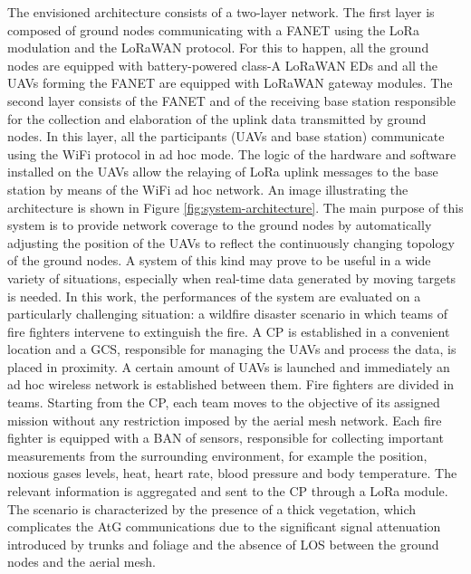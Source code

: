 The envisioned architecture consists of a two-layer network. The first layer is composed of ground nodes communicating with a \gls{FANET} using the LoRa modulation and the LoRaWAN protocol. For this to happen, all the ground nodes are equipped with battery-powered class-A LoRaWAN \glspl{ED} and all the \glspl{UAV} forming the \gls{FANET} are equipped with LoRaWAN gateway modules. The second layer consists of the \gls{FANET} and of the receiving base station responsible for the collection and elaboration of the uplink data transmitted by ground nodes. In this layer, all the participants (\glspl{UAV} and base station) communicate using the WiFi protocol in ad hoc mode. The logic of the hardware and software installed on the \glspl{UAV} allow the relaying of LoRa uplink messages to the base station by means of the WiFi ad hoc network. An image illustrating the architecture is shown in Figure \ref{fig:system-architecture}.
The main purpose of this system is to provide network coverage to the ground nodes by automatically adjusting the position of the \glspl{UAV} to reflect the continuously changing topology of the ground nodes. A system of this kind may prove to be useful in a wide variety of situations, especially when real-time data generated by moving targets is needed. In this work, the performances of the system are evaluated on a particularly challenging situation: a wildfire disaster scenario in which teams of fire fighters intervene to extinguish the fire. A \gls{CP} is established in a convenient location and a \gls{GCS}, responsible for managing the \glspl{UAV} and process the data, is placed in proximity. A certain amount of \glspl{UAV} is launched and immediately an ad hoc wireless network is established between them. Fire fighters are 
divided in teams. Starting from the \gls{CP}, each team moves to the objective of its assigned mission without any restriction imposed by the aerial mesh network. Each fire fighter is equipped with a \gls{BAN} of sensors, responsible for collecting important measurements from the surrounding environment, for example the position, noxious gases levels, heat, heart rate, blood pressure and body temperature. The relevant information is aggregated and sent to the \gls{CP} through a LoRa module. The scenario is characterized by the presence of a thick vegetation, which complicates the \gls{AtG} communications due to the significant signal attenuation introduced by trunks and foliage and the absence of \gls{LOS} between the ground nodes and the aerial mesh.

